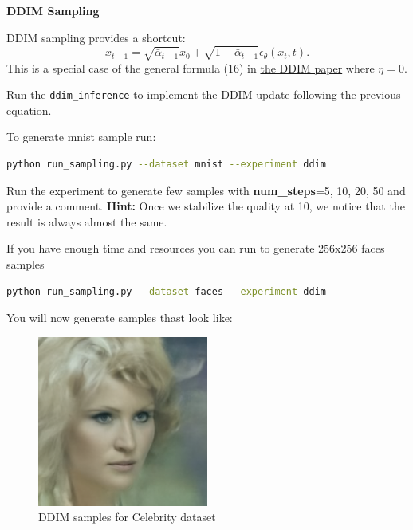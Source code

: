 \textbf{DDIM Sampling}

DDIM sampling provides a shortcut:
\[
x_{t-1} = \sqrt{\bar{\alpha}_{t-1}}x_0 + \sqrt{1-\bar{\alpha}_{t-1}}\epsilon_\theta(x_t,t).
\]
This is a special case of the general formula (16) in \href{https://arxiv.org/pdf/2010.02502}{the DDIM paper} where $\eta = 0$.

Run the \texttt{ddim\_inference} to implement the DDIM update following the previous equation.

To generate mnist sample run: 
\begin{lstlisting}[language=bash]
    python run_sampling.py --dataset mnist --experiment ddim
\end{lstlisting}

Run the experiment to generate few samples with \textbf{num\_steps}=5, 10, 20, 50 and provide a comment. 
\textbf{Hint: }Once we stabilize the quality at 10, we notice that the result is always almost the same.

If you have enough time and resources you can run to generate 256x256 faces samples

\begin{lstlisting}[language=bash]
    python run_sampling.py --dataset faces --experiment ddim
\end{lstlisting}

You will now generate samples thast look like:

\begin{figure}[H]
    \centering
    \includegraphics[width=0.5\textwidth]{./figures/ddim_steps10_seed42_img_0}
    \caption{DDIM samples for Celebrity dataset}
\end{figure}
